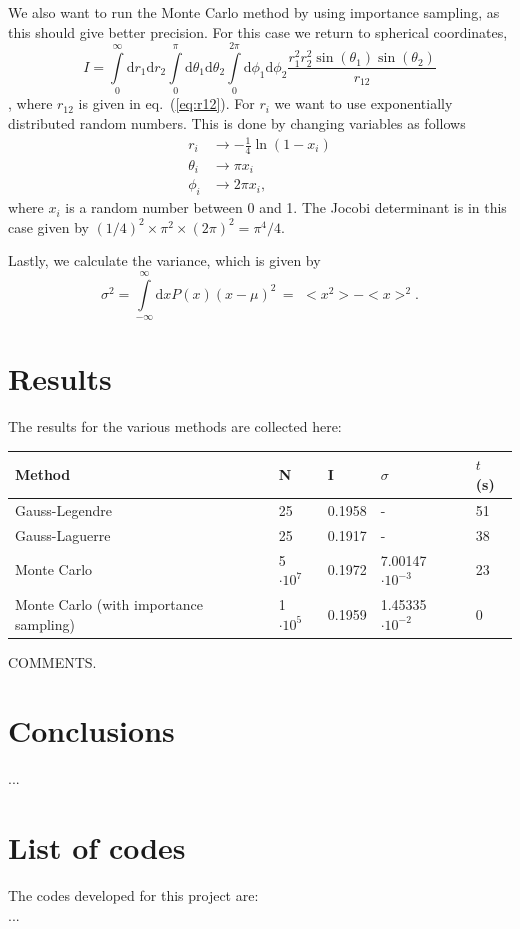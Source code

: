\documentclass{article}
\begin{document}
We also want to run the Monte Carlo method by using importance sampling, as this should give better precision.
For this case we return to spherical coordinates,
\begin{equation}
	I = \int\limits_0^{\infty}\mathrm{d}r_1\mathrm{d}r_2\int\limits_0^{\pi}\mathrm{d}\theta_1\mathrm{d}\theta_2\int\limits_0^{2\pi}\mathrm{d}\phi_1\mathrm{d}\phi_2
	\frac{r_1^2r_2^2\sin(\theta_1)\sin(\theta_2)}{r_{12}}
\end{equation}, where $r_{12}$ is given in eq.~(\ref{eq:r12}).
For $r_i$ we want to use exponentially distributed random numbers.
This is done by changing variables as follows
\begin{align*}
	r_i &\rightarrow -\frac{1}{4}\ln(1-x_i) \\
	\theta_i &\rightarrow \pi x_i \\
	\phi_i &\rightarrow 2\pi x_i,
\end{align*}
where $x_i$ is a random number between 0 and 1.
The Jocobi determinant is in this case given by $(1/4)^2\times\pi^2\times(2\pi)^2 = \pi^4/4$.


Lastly, we calculate the variance, which is given by 
\begin{equation}\label{eq:variance}
	\sigma^2 = \int\limits_{-\infty}^{\infty}\mathrm{d}xP(x)(x-\mu)^2 \,= \,\,<x^2>-<x>^2.
\end{equation}


\section{Results}
The results for the various methods are collected here:

\begin{center}
\begin{tabular}{ l l l l l}\hline
	Method 									& N	 				&I			&$\sigma$				& $t$ (s) \\ \hline
	Gauss-Legendre 							& 25 					& 0.1958		& -						& 51 \\
	Gauss-Laguerre 							& 25					& 0.1917		& -						& 38 \\
	Monte Carlo 								& 5 $\cdot 10^7$ 		& 0.1972		& 7.00147 $\cdot 10^{-3}$		& 23 \\
	Monte Carlo (with importance sampling) 			& 1 $\cdot 10^5$		& 0.1959		& 1.45335 $\cdot 10^{-2}$		& 0 \\
	\hline
\end{tabular}
\end{center}
COMMENTS.



\section{Conclusions}
...





\section{List of codes}

The codes developed for this project are:\\
...

\end{document}
